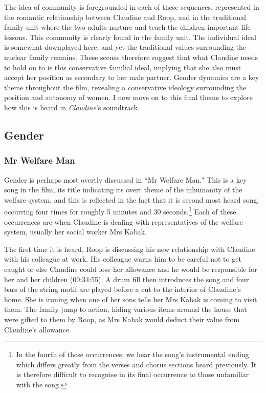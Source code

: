 The idea of community is foregrounded in each of these sequences, represented in the romantic relationship between Claudine and Roop, and in the traditional family unit where the two adults nurture and teach the children important life lessons.
This community is clearly found in the family unit.
The individual ideal is somewhat downplayed here, and yet the traditional values surrounding the nuclear family remains.
These scenes therefore suggest that what Claudine needs to hold on to is this conservative familial ideal, implying that she also must accept her position as secondary to her male partner.
Gender dynamics are a key theme throughout the film, revealing a conservative ideology surrounding the position and autonomy of women.
I now move on to this final theme to explore how this is heard in \textit{Claudine}'s soundtrack.



\subsection{Gender}

\subsubsection{Mr Welfare Man}

Gender is perhaps most overtly discussed in ``Mr Welfare Man."
This is a key song in the film, its title indicating its overt theme of the inhumanity of the welfare system, and this is reflected in the fact that it is second most heard song, occurring four times for roughly 5 minutes and 30 seconds.\footnote{In the fourth of these occurrences, we hear the song's instrumental ending which differs greatly from the verses and chorus sections heard previously. It is therefore difficult to recognise in its final occurrence to those unfamiliar with the song.}
Each of these occurrences are when Claudine is dealing with representatives of the welfare system, usually her social worker Mrs Kabak.

The first time it is heard, Roop is discussing his new relationship with Claudine with his colleague at work.
His colleague warns him to be careful not to get caught or else Claudine could lose her allowance and he would be responsible for her and her children (00:34:55).
A drum fill then introduces the song and four bars of the string motif are played before a cut to the interior of Claudine's home.
She is ironing when one of her sons tells her Mrs Kabak is coming to visit them.
The family jump to action, hiding various items around the house that were gifted to them by Roop, as Mrs Kabak would deduct their value from Claudine's allowance.

